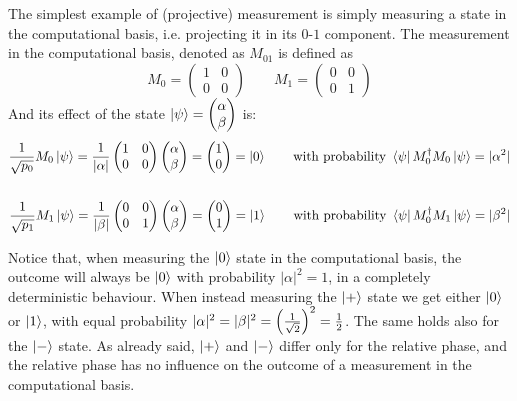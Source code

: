 The simplest example of (projective) measurement is simply measuring a state in the computational basis, i.e. projecting it in its $0$-$1$ component. The measurement in the computational basis, denoted as $M_{01}$ is defined as \[ M_0 = \begin{pmatrix} 1 & 0 \\ 0 & 0\end{pmatrix} \qquad
M_1 = \begin{pmatrix}0 & 0 \\ 0 & 1\end{pmatrix} \]
And its effect of the state $\ket{\psi} = \begin{pmatrix}\alpha \\ \beta \end{pmatrix}$ is:
\begin{align*}
\frac{1}{\sqrt{p_0}}M_0\ket{\psi} = \frac{1}{|\alpha|}\begin{pmatrix} 1 & 0 \\ 0 & 0\end{pmatrix}
\begin{pmatrix}\alpha \\ \beta \end{pmatrix} = \begin{pmatrix} 1 \\ 0 \end{pmatrix} = \ket{0} 
\qquad \text{with probability } \bra{\psi}M_0^\dagger M_0\ket{\psi} = |\alpha^2| \\
\\
\frac{1}{\sqrt{p_1}}M_1\ket{\psi} = \frac{1}{|\beta|}\begin{pmatrix} 0 & 0 \\ 0 & 1\end{pmatrix}
\begin{pmatrix}\alpha \\ \beta \end{pmatrix} = \begin{pmatrix} 0 \\ 1 \end{pmatrix} = \ket{1} 
\qquad \text{with probability } \bra{\psi}M_0^\dagger M_1\ket{\psi} = |\beta^2|
\end{align*}

Notice that, when measuring the $\ket{0}$ state in the computational basis, the outcome will always be $\ket{0}$ with probability $|\alpha|^2 = 1$, in a completely deterministic behaviour. 
When instead measuring the $\ket{+}$ state we get either $\ket{0}$ or $\ket{1}$, with equal probability $|\alpha|^2 = |\beta|^2 = \left(\frac{1}{\sqrt{2}}\right)^2 = \frac{1}{2}$. The same holds also for the $\ket{-}$ state. As already said, $\ket{+}$ and $\ket{-}$ differ only for the relative phase, and the relative phase has no influence on the outcome of a measurement in the computational basis.


